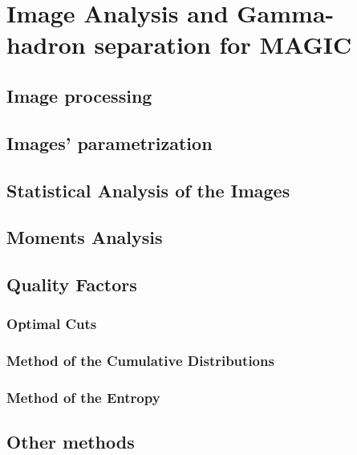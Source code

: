 

\chapter{Image Analysis and Gamma-hadron separation for MAGIC}
\label{chapter:imageana}

\section{Image processing}

\section{Images' parametrization}

\section{Statistical Analysis of the Images}

\section{Moments Analysis}

\section{Quality Factors}

\subsection{Optimal Cuts}

\subsection{Method of the Cumulative Distributions}

\subsection{Method of the Entropy}

\section{Other methods}


\endinput
%

